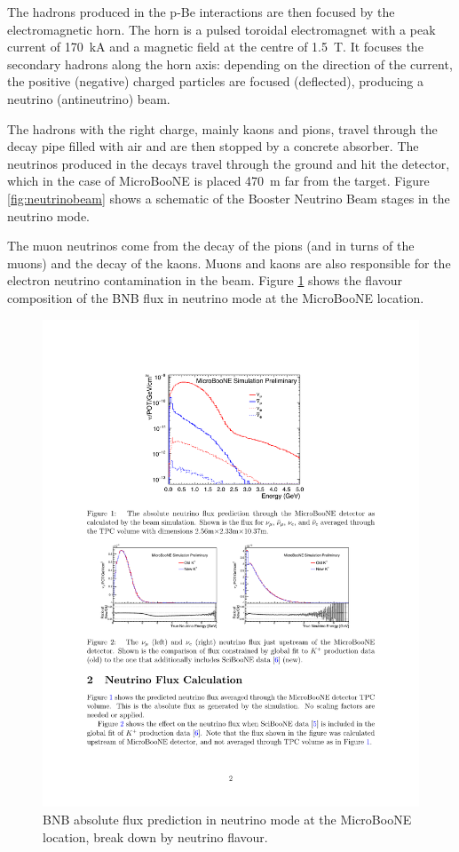 The hadrons produced in the p-Be interactions are then focused by the electromagnetic horn. The horn is a pulsed toroidal electromagnet with a peak current of 170~kA and a magnetic field at the centre of 1.5~T. It focuses the secondary hadrons along the horn axis: depending on the direction of the current, the positive (negative) charged particles are focused (deflected), producing a neutrino (antineutrino) beam. 

The hadrons with the right charge, mainly kaons and pions, travel through the decay pipe filled with air and are then stopped by a concrete absorber. The neutrinos produced in the decays travel through the ground and hit the detector, which in the case of MicroBooNE is placed 470~m far from the target. Figure \ref{fig:neutrinobeam} shows a schematic of the Booster Neutrino Beam stages in the neutrino mode. 

The muon neutrinos come from the decay of the pions (and in turns of the muons) and the decay of the kaons. Muons and kaons are also responsible for the electron neutrino contamination in the beam. Figure \ref{fig:bnbflux} shows the flavour composition of the BNB flux in neutrino mode at the MicroBooNE location.

\begin{figure}[htbp]
    \centering
    \includegraphics[width=0.7\linewidth]{figures/bnbflux.pdf}
    \caption{BNB absolute flux prediction in neutrino mode at the MicroBooNE location, break down by neutrino flavour.}
    \label{fig:bnbflux}
\end{figure}


